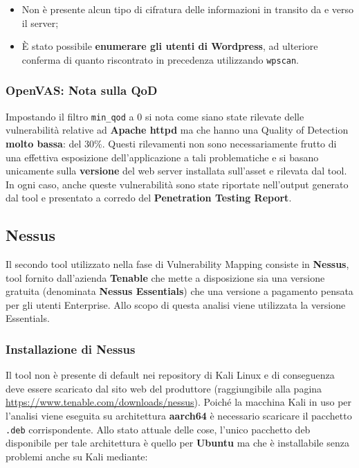 \documentclass[a4paper, 12pt, oneside]{article}
\begin{document}
\begin{itemize}
    \item Non è presente alcun tipo di cifratura delle informazioni in transito da e verso il server;
    \item È stato possibile \textbf{enumerare gli utenti di Wordpress}, ad ulteriore conferma di quanto riscontrato in precedenza utilizzando \texttt{wpscan}.
\end{itemize}

\subsubsection{OpenVAS: Nota sulla QoD}
Impostando il filtro \texttt{min\_qod} a 0 si nota come siano state rilevate delle vulnerabilità relative ad \textbf{Apache httpd} ma che hanno una Quality of Detection \textbf{molto bassa}: del 30\%. Questi rilevamenti non sono necessariamente frutto di una effettiva esposizione dell'applicazione a tali problematiche e si basano unicamente sulla \textbf{versione} del web server installata sull'asset e rilevata dal tool. In ogni caso, anche queste vulnerabilità sono state riportate nell'output generato dal tool e presentato a corredo del \textbf{Penetration Testing Report}.

\subsection{Nessus}
Il secondo tool utilizzato nella fase di Vulnerability Mapping consiste in \textbf{Nessus}, tool fornito dall'azienda \textbf{Tenable} che mette a disposizione sia una versione gratuita (denominata \textbf{Nessus Essentials}) che una versione a pagamento pensata per gli utenti Enterprise. Allo scopo di questa analisi viene utilizzata la versione Essentials.

\subsubsection{Installazione di Nessus}
Il tool non è presente di default nei repository di Kali Linux e di conseguenza deve essere scaricato dal sito web del produttore (raggiungibile alla pagina \url{https://www.tenable.com/downloads/nessus}). Poiché la macchina Kali in uso per l'analisi viene eseguita su architettura \textbf{aarch64} è necessario scaricare il pacchetto \texttt{.deb} corrispondente. Allo stato attuale delle cose, l'unico pacchetto deb disponibile per tale architettura è quello per \textbf{Ubuntu} ma che è installabile senza problemi anche su Kali mediante:
\end{document}
